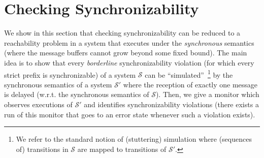 \section{Checking Synchronizability}\label{sec:verif}

We show in this section that checking synchronizability can be reduced 
to a reachability problem in a system that executes under the \emph{synchronous} semantics 
(where the message buffers cannot grow beyond some fixed bound). The main idea is to show that every
\emph{borderline} synchronizability violation (for which every strict prefix is synchronizable) of a system $\mathcal{S}$ can be ``simulated''~\footnote{We refer to the standard notion of (stuttering) simulation where (sequences of) transitions in $\mathcal{S}$ are mapped to transitions of $\mathcal{S'}$.}
by the synchronous semantics of a system $\mathcal{S'}$ where the reception of exactly one message is delayed (w.r.t. the synchronous semantics of $\mathcal{S}$).
Then, we give a monitor which observes executions of $\mathcal{S'}$ and identifies synchronizability violations
(there exists a run of this monitor that goes to an error state whenever such a violation exists).

